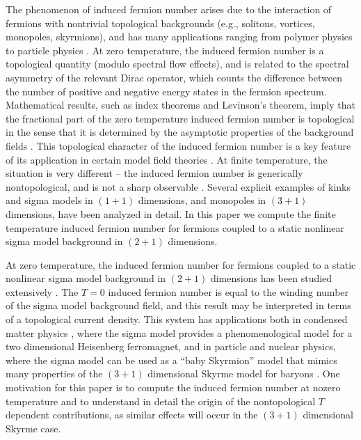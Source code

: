 \documentclass[a4paper,prd]{revtex4}
\begin{document}
The phenomenon of induced fermion number arises due to the interaction of
fermions with nontrivial topological backgrounds (e.g., solitons, vortices,
monopoles, skyrmions), and has many applications ranging from polymer physics
to particle physics \cite{jr,gw,bag,jackiw2,rajaraman,niemi,polymer,amo}.
At zero temperature, the induced fermion number is a topological quantity
(modulo spectral flow effects), and is related to the spectral asymmetry
of the relevant Dirac operator, which counts the difference between the
number of positive and negative energy states in the fermion spectrum.
Mathematical results, such as index theorems and Levinson's theorem,
imply that the fractional part of the zero temperature induced fermion 
number is topological in the sense that it is determined by the
asymptotic properties of the background fields
\cite{rich,wilczek,boy,mike,poly,jaffe2}. This topological character of the induced
fermion number is a key feature of its application in certain model field theories
\cite{eric,weigel,manu,diakonov}. At finite  temperature, the situation is very different -- the
induced fermion number is  generically nontopological, and is not a sharp observable
\cite{ad,dr,leipzig}. Several explicit examples of kinks \cite{ns,soni,keil} and sigma
models \cite{ad,dr} in $(1+1)$ dimensions, and monopoles \cite{cp,goldhaber,monopole,ad}
in $(3+1)$ dimensions, have been analyzed in detail. In this paper we compute the
finite  temperature induced fermion number for fermions coupled to a static nonlinear
sigma model background in $(2+1)$ dimensions. 

At zero temperature, the induced fermion number for fermions coupled
to a static nonlinear sigma  model background in $(2+1)$ dimensions has
been studied extensively
\cite{jaro1,carena,aw,abanov}. The $T=0$ induced fermion number is equal to the
winding number of the sigma model background field, and this result may be
interpreted in terms of a topological current density. This system has applications
both in condensed matter physics \cite{wilczekzee,aw}, where the sigma model
provides a phenomenological model for a two dimensional Heisenberg ferromagnet, and
in particle and nuclear physics, where the sigma model can be used as a ``baby
Skyrmion'' model \cite{jaro1,carena,jaro2,krishna} that mimics many
properties of the $(3+1)$ dimensional Skyrme model for baryons
\cite{weigel}. One motivation for this paper
is to compute the induced fermion number at nozero temperature and to
understand in detail the origin of the nontopological $T$ dependent
contributions, as similar effects will occur in the $(3+1)$ dimensional
Skyrme case.
\end{document}
